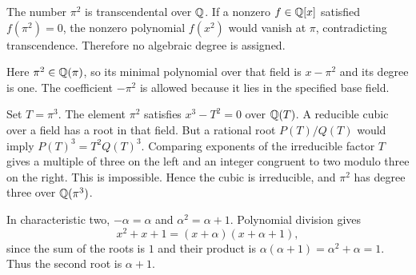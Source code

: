 The number $\pi^2$ is transcendental over $\mathbb{Q}$. If a nonzero $f\in\mathbb{Q}[x]$ satisfied $f(\pi^2)=0$, the nonzero polynomial $f(x^2)$ would vanish at $\pi$, contradicting transcendence. Therefore no algebraic degree is assigned.

Here $\pi^2\in\mathbb{Q}(\pi)$, so its minimal polynomial over that field is $x-\pi^2$ and its degree is one. The coefficient $-\pi^2$ is allowed because it lies in the specified base field.

Set $T=\pi^3$. The element $\pi^2$ satisfies $x^3-T^2=0$ over $\mathbb{Q}(T)$. A reducible cubic over a field has a root in that field. But a rational root $P(T)/Q(T)$ would imply $P(T)^3=T^2Q(T)^3$. Comparing exponents of the irreducible factor $T$ gives a multiple of three on the left and an integer congruent to two modulo three on the right. This is impossible. Hence the cubic is irreducible, and $\pi^2$ has degree three over $\mathbb{Q}(\pi^3)$.

In characteristic two, $-\alpha=\alpha$ and $\alpha^2=\alpha+1$. Polynomial division gives
\[x^2+x+1=(x+\alpha)(x+\alpha+1),\]
since the sum of the roots is $1$ and their product is $\alpha(\alpha+1)=\alpha^2+\alpha=1$. Thus the second root is $\alpha+1$.

